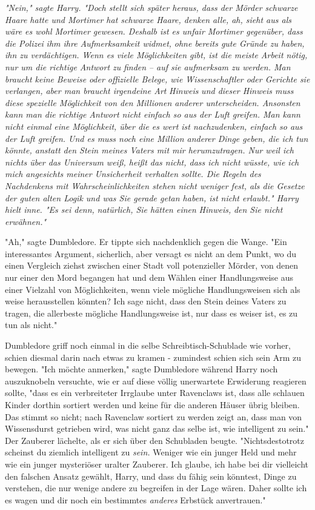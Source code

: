 {\emph{"Nein," sagte Harry. "Doch stellt sich später heraus, dass der Mörder schwarze Haare hatte und Mortimer hat schwarze Haare, denken alle, ah, sieht aus als wäre es wohl Mortimer gewesen. Deshalb ist es unfair Mortimer gegenüber, dass die Polizei} \emph{\emph{ihm ihre Aufmerksamkeit widmet,}} \emph{ohne bereits gute Gründe zu haben, ihn zu verdächtigen. Wenn es viele Möglichkeiten gibt, ist die meiste Arbeit nötig, nur um die richtige Antwort zu} \emph{\emph{finden}} \emph{-- auf sie aufmerksam zu werden. Man braucht keine} \emph{\emph{Beweise}} \emph{oder offizielle Belege, wie Wissenschaftler oder Gerichte sie verlangen, aber man braucht irgendeine Art} \emph{\emph{Hinweis}} \emph{und dieser Hinweis muss diese spezielle Möglichkeit von den Millionen anderer unterscheiden. Ansonsten kann man die richtige Antwort nicht einfach so aus der Luft greifen. Man kann nicht einmal eine Möglichkeit, über die es wert ist nachzudenken, einfach so aus der Luft greifen. Und es muss noch eine Million anderer Dinge geben, die ich tun könnte, anstatt den Stein meines Vaters mit mir herumzutragen. Nur weil ich nichts über das Universum weiß, heißt das nicht, dass ich nicht wüsste, wie ich mich angesichts meiner Unsicherheit verhalten sollte. Die Regeln des Nachdenkens mit Wahrscheinlichkeiten stehen nicht weniger fest, als die Gesetze der guten alten Logik und was Sie gerade getan haben, ist} \emph{\emph{nicht erlaubt.}" Harry hielt inne. "\emph{Es sei denn,}} \emph{natürlich, Sie hätten einen} \emph{\emph{Hinweis,}} \emph{den Sie nicht erwähnen."}

"Ah," sagte Dumbledore. Er tippte sich nachdenklich gegen die Wange. "Ein interessantes Argument, sicherlich, aber versagt es nicht an dem Punkt, wo du einen Vergleich ziehst zwischen einer Stadt voll potenzieller Mörder, von denen nur einer den Mord begangen hat und dem Wählen einer Handlungsweise aus einer Vielzahl von Möglichkeiten, wenn viele mögliche Handlungsweisen sich als weise herausstellen könnten? Ich sage nicht, dass den Stein deines Vaters zu tragen, die allerbeste mögliche Handlungsweise ist, nur dass es weiser ist, es zu tun als nicht."

Dumbledore griff noch einmal in die selbe Schreibtisch-Schublade wie vorher, schien diesmal darin nach etwas zu kramen - zumindest schien sich sein Arm zu bewegen. "Ich möchte anmerken," sagte Dumbledore während Harry noch auszuknobeln versuchte, wie er auf diese völlig unerwartete Erwiderung reagieren sollte, "dass es ein verbreiteter Irrglaube unter Ravenclaws ist, dass alle schlauen Kinder dorthin sortiert werden und keine für die anderen Häuser übrig bleiben. Das stimmt so nicht; nach Ravenclaw sortiert zu werden zeigt an, dass man von Wissensdurst getrieben wird, was nicht ganz das selbe ist, wie intelligent zu sein." Der Zauberer lächelte, als er sich über den Schubladen beugte. "Nichtsdestotrotz scheinst du ziemlich intelligent zu \emph{sein.} Weniger wie ein junger Held und mehr wie ein junger mysteriöser uralter Zauberer. Ich glaube, ich habe bei dir vielleicht den falschen Ansatz gewählt, Harry, und dass du fähig sein könntest, Dinge zu verstehen, die nur wenige andere zu begreifen in der Lage wären. Daher sollte ich es wagen und dir noch ein bestimmtes \emph{anderes} Erbstück anvertrauen."

}
